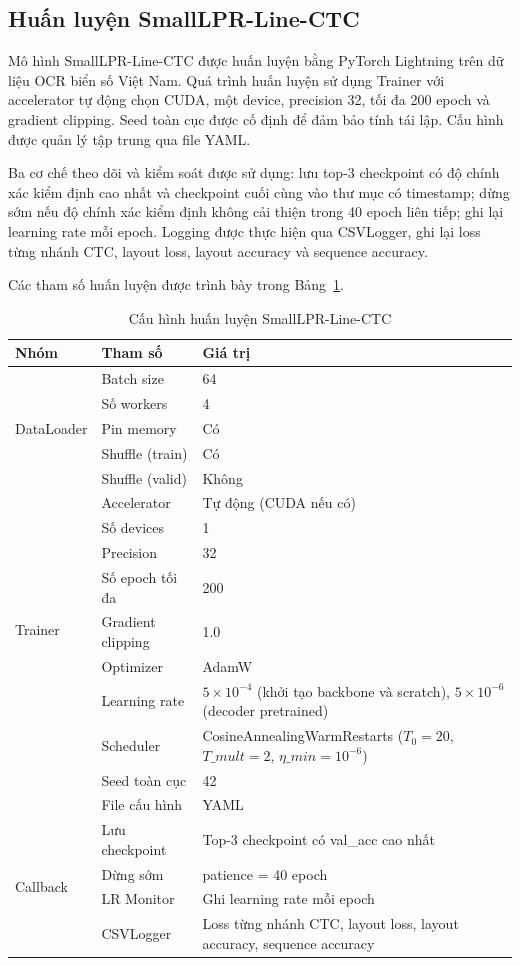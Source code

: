 \documentclass[../DoAn.tex]{subfiles}
\begin{document}
\subsection{Huấn luyện SmallLPR-Line-CTC}
\label{subsection:4.2.4_ocr}

Mô hình SmallLPR-Line-CTC được huấn luyện bằng PyTorch Lightning trên dữ liệu OCR biển số Việt Nam. 
Quá trình huấn luyện sử dụng Trainer với accelerator tự động chọn CUDA, một device, precision 32, tối đa 200 epoch và gradient clipping. Seed toàn cục được cố định để đảm bảo tính tái lập. Cấu hình được quản lý tập trung qua file YAML.

Ba cơ chế theo dõi và kiểm soát được sử dụng: lưu top-3 checkpoint có độ chính xác kiểm định cao nhất và checkpoint cuối cùng vào thư mục có timestamp; dừng sớm nếu độ chính xác kiểm định không cải thiện trong 40 epoch liên tiếp; ghi lại learning rate mỗi epoch. Logging được thực hiện qua CSVLogger, ghi lại loss từng nhánh CTC, layout loss, layout accuracy và sequence accuracy.

Các tham số huấn luyện được trình bày trong Bảng~\ref{tab:lpr_all_config}.

\begin{table}[htbp]
\centering
\caption{Cấu hình huấn luyện SmallLPR-Line-CTC}
\label{tab:lpr_all_config}
\begin{tabularx}{\textwidth}{|l|l|X|}
\hline
\textbf{Nhóm} & \textbf{Tham số} & \textbf{Giá trị} \\
\hline
\multirow{5}{*}{DataLoader}
 & Batch size & 64 \\
 & Số workers & 4 \\
 & Pin memory & Có \\
 & Shuffle (train) & Có \\
 & Shuffle (valid) & Không \\
\hline
\multirow{8}{*}{Trainer}
 & Accelerator & Tự động (CUDA nếu có) \\
 & Số devices & 1 \\
 & Precision & 32 \\
 & Số epoch tối đa & 200 \\
 & Gradient clipping & 1.0 \\
 & Optimizer & AdamW \\
 & Learning rate & $5 \times 10^{-4}$ (khởi tạo backbone và scratch), $5 \times 10^{-6}$ (decoder pretrained) \\
 & Scheduler & CosineAnnealingWarmRestarts ($T_0=20$, $T\_{mult}=2$, $\eta\_{min}=10^{-6}$) \\
 & Seed toàn cục & 42 \\
 & File cấu hình & YAML \\
\hline
\multirow{4}{*}{Callback}
 & Lưu checkpoint & Top-3 checkpoint có val\_acc cao nhất \\
 & Dừng sớm & patience = 40 epoch \\
 & LR Monitor & Ghi learning rate mỗi epoch \\
 & CSVLogger & Loss từng nhánh CTC, layout loss, layout accuracy, sequence accuracy \\
\hline
\end{tabularx}
\end{table}
\end{document}
